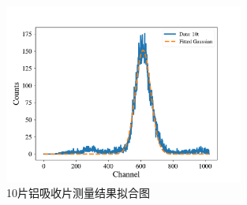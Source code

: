\documentclass{article}
\begin{document}
    \begin{figure}[htbp]
        \centering
        \includegraphics[width=0.7\textwidth]{../plot/Fitted_10t.pdf}
        \caption{10片铝吸收片测量结果拟合图\label{fig:Fitted_10t}}
    \end{figure}
\end{document}
